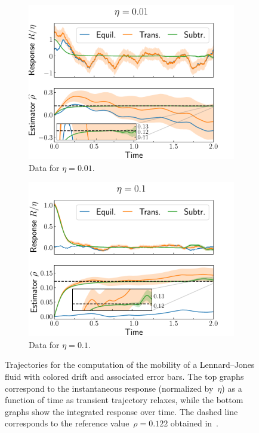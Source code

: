 \documentclass[11pt]{article}
\theoremstyle{definition}
\begin{document}
\begin{figure}[h!]
\centering
\begin{subfigure}{0.49\textwidth}
    \includegraphics[width=\textwidth]{LJ_mobility_0.01.pdf}
    \caption{Data for $\eta = 0.01$.}
    \label{subfig:mobility_0.01}
\end{subfigure}
\hfill
\begin{subfigure}{0.49\textwidth}
    \includegraphics[width=\textwidth]{LJ_mobility_0.1.pdf}
    \caption{Data for $\eta = 0.1$.}
    \label{subfig:mobility_0.1}
\end{subfigure}
\caption{Trajectories for the computation of the mobility of a Lennard--Jones fluid with colored drift and associated error bars. The top graphs correspond to the instantaneous response (normalized by~$\eta$) as a function of time as transient trajectory relaxes, while the bottom graphs show the integrated response over time. The dashed line corresponds to the reference value~$\rho = 0.122$ obtained in~\cite{meier2004, blassel2024}.}
\label{fig:LJ_mobility}
\end{figure}
\end{document}
